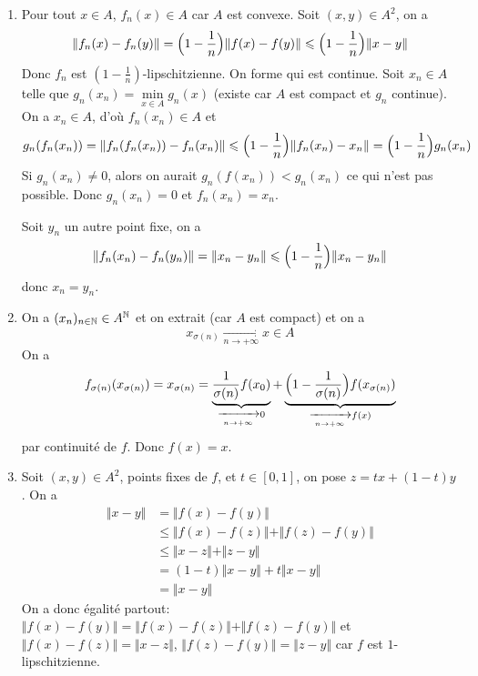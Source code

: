 \begin{solution}
	\phantom{}
	\begin{enumerate}
		\item Pour tout $x\in A$, $f_{n}(x)\in A$ car $A$ est convexe. Soit $(x,y)\in A^{2}$, on a
		$$\Vert f_{n}(x)-f_{n}(y)\Vert=\Bigl(1-\frac{1}{n}\Bigr)\Vert f(x)-f(y)\Vert\leqslant\Bigl(1-\frac{1}{n}\Bigr)\Vert x-y\Vert$$
		Donc $f_{n}$ est $(1-\frac{1}{n})$-lipschitzienne. On forme 
		qui est continue. Soit $x_{n}\in A$ telle que $g_{n}(x_{n})=\min\limits_{x\in A}g_{n}(x)$ (existe car $A$ est compact et $g_{n}$ continue). On a $x_{n}\in A$, d'où $f_{n}(x_{n})\in A$ et 
		$$g_{n}(f_{n}(x_{n}))=\Vert f_{n}(f_{n}(x_{n}))-f_{n}(x_{n})\Vert\leqslant\Bigl(1-\frac{1}{n}\Bigr)\Vert f_{n}(x_{n})-x_{n}\Vert=\Bigl(1-\frac{1}{n}\Bigr)g_{n}(x_{n})$$
		Si $g_{n}(x_{n})\neq0$, alors on aurait $g_{n}(f(x_{n}))<g_{n}(x_{n})$ ce qui n'est pas possible. Donc $g_{n}(x_{n})=0$ et $f_{n}(x_{n})=x_{n}$.

		Soit $y_{n}$ un autre point fixe, on a 
		$$\Vert f_{n}(x_{n})-f_{n}(y_{n})\Vert=\Vert x_{n}-y_{n}\Vert\leqslant\Bigl(1-\frac{1}{n}\Bigr)\Vert x_{n}-y_{n}\Vert$$
		donc $x_{n}=y_{n}$.

		\item On a $(x_{n})_{n\in\mathbb{N}}\in A^{\mathbb{N}}$ et on extrait (car $A$ est compact) et on a 
		$$x_{\sigma(n)}\xrightarrow[n\to+\infty]{}x\in A$$
		On a 
		$$f_{\sigma(n)}(x_{\sigma(n)})=x_{\sigma(n)}=\underbrace{\frac{1}{\sigma(n)}f(x_{0})}_{\xrightarrow[n\to+\infty]{}0}+\underbrace{\Bigl(1-\frac{1}{\sigma(n)}\Bigr)f(x_{\sigma(n)})}_{\xrightarrow[n\to+\infty]{}f(x)}$$
		par continuité de $f$. Donc $f(x)=x$.

		\item Soit $(x,y)\in A^{2}$, points fixes de $f$, et $t\in[0,1]$, on pose $z=tx+(1-t)y$. On a 
		\begin{align*}
			\Vert x-y\Vert
			&=\Vert f(x)-f(y)\Vert\\
			&\leqslant \Vert f(x)-f(z)\Vert+\Vert f(z)-f(y)\Vert\\
			&\leqslant\Vert x-z\Vert+\Vert z-y\Vert\\
			&=(1-t)\Vert x-y\Vert+t\Vert x-y\Vert\\
			&=\Vert x-y\Vert
		\end{align*}
		On a donc égalité partout: $\Vert f(x)-f(y)\Vert=\Vert f(x)-f(z)\Vert+\Vert f(z)-f(y)\Vert$ et $\Vert f(x)-f(z)\Vert=\Vert x-z\Vert$, $\Vert f(z)-f(y)\Vert=\Vert z-y\Vert$ car $f$ est $1$-lipschitzienne.


\end{enumerate}
\end{solution}
